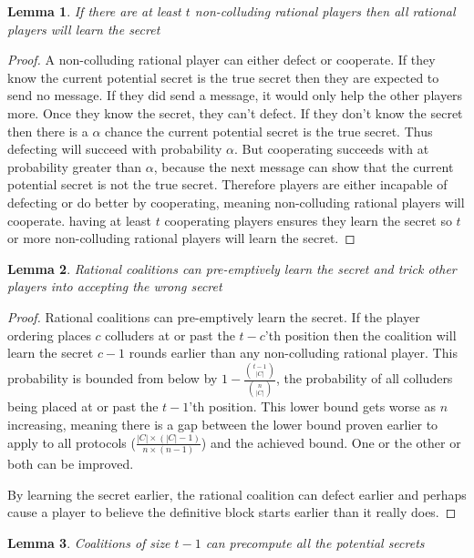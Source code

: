 \documentclass{dalcsthesis}
\newtheorem{lemma}{Lemma}
\begin{document}
\begin{lemma} If there are at least $t$ non-colluding rational players then all rational players will learn the secret \end{lemma}
\begin{proof}
A non-colluding rational player can either defect or cooperate. If they know the current potential secret is the true secret then they are expected to send no message. If they did send a message, it would only help the other players more. Once they know the secret, they can't defect. If they don't know the secret then there is a $\alpha$ chance the current potential secret is the true secret. Thus defecting will succeed with probability $\alpha$. But cooperating succeeds with at probability greater than $\alpha$, because the next message can show that the current potential secret is not the true secret. Therefore players are either incapable of defecting or do better by cooperating, meaning non-colluding rational players will cooperate. having at least $t$ cooperating players ensures they learn the secret so $t$ or more non-colluding rational players will learn the secret.
\end{proof}

\begin{lemma} Rational coalitions can pre-emptively learn the secret and trick other players into accepting the wrong secret \end{lemma}
\begin{proof}
Rational coalitions can pre-emptively learn the secret. If the player ordering places $c$ colluders at or past the $t-c$'th position then the coalition will learn the secret $c-1$ rounds earlier than any non-colluding rational player. This probability is bounded from below by $1 - \frac{{t - 1 \choose |C|}}{{n \choose |C|}}$, the probability of all colluders being placed at or past the $t-1$'th position. This lower bound gets worse as $n$ increasing, meaning there is a gap between the lower bound proven earlier to apply to all protocols ($\frac{|C| \times (|C|-1)}{n \times (n-1)}$) and the achieved bound. One or the other or both can be improved.

By learning the secret earlier, the rational coalition can defect earlier and perhaps cause a player to believe the definitive block starts earlier than it really does.
\end{proof}

\begin{lemma} Coalitions of size $t-1$ can precompute all the potential secrets \end{lemma}
\end{document}
